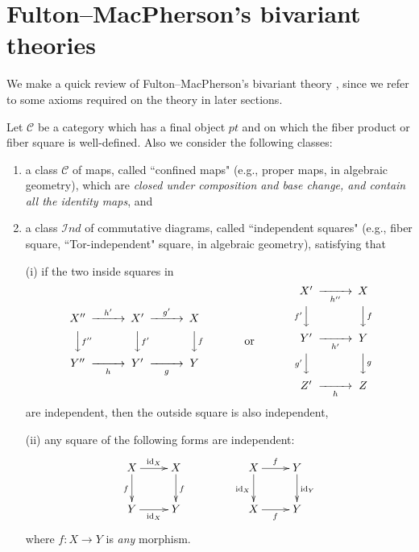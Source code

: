 \documentclass[a4paper]{amsart}
\begin{document}
\section{Fulton--MacPherson's bivariant theories}\label{BT}

We make a quick review of Fulton--MacPherson's bivariant theory \cite {FM}, since we refer to some axioms required on the theory in later sections.

Let $\mathscr C$ be a category which has a final object $pt$ and on which the fiber product or fiber square is well-defined. Also we consider the following classes:
\begin{enumerate}
\item a class $\mathcal C$ of maps, called ``confined maps" (e.g., proper maps, in algebraic geometry), which are \emph{closed under composition and base change, and contain all the identity maps}, and 
\item a class $\mathcal Ind$ of commutative diagrams, called ``independent squares" (e.g., fiber square, ``Tor-independent" square, in algebraic geometry), 
satisfying that

(i) if the two inside squares in  
$$\CD
X''@> {h'} >> X' @> {g'} >> X \\
@VV {f''}V @VV {f'}V @VV {f}V\\
Y''@>> {h} > Y' @>> {g} > Y \endCD
\quad \quad \qquad \text{or} \qquad \quad \quad 
\CD
X' @>> {h''} > X \\
@V {f'}VV @VV {f}V\\
Y' @>> {h'} > Y \\
@V {g'}VV @VV {g}V \\
Z'  @>> {h} > Z \endCD
$$
are independent, then the outside square is also independent,

(ii) any square of the following forms are independent:
$$
\xymatrix{X \ar[d]_{f} \ar[r]^{\op {id}_X}&  X \ar[d]^f & & X \ar[d]_{\op {id}_X} \ar[r]^f & Y \ar[d]^{\op {id}_Y} \\
Y \ar[r]_{\op {id}_X}  & Y && X \ar[r]_f & Y}
$$
where $f:X \to Y$ is \emph{any} morphism. 
\end{enumerate}
\end{document}
